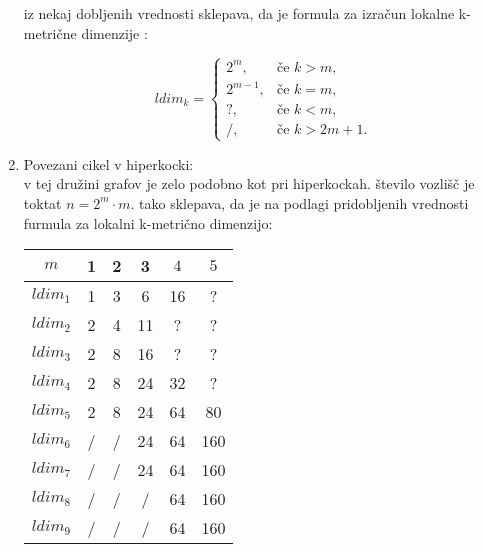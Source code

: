\documentclass[12pt,a4paper]{amsart}
\theoremstyle{plain} %
\begin{document}
\begin{enumerate}
\begin{table}[h]
\begin{center}
\begin{tabular}{|c|c|c|c|c|c|}
            \hline
        \end{tabular}
    \end{center}
    
    
\end{table}

iz nekaj dobljenih vrednosti sklepava, da je formula za izračun lokalne k-metrične dimenzije :

\begin{equation}
ldim_k =
\begin{cases}
  2^m , & \text{če } k > m, \\
  2^{m-1} , & \text{če } k = m,\\
  ?, & \text{če } k < m, \\
  /, & \text{če } k >2 m +1 . \nonumber
\end{cases}
\end{equation}



\item Povezani cikel v hiperkocki: \\
v tej družini grafov je zelo podobno kot pri hiperkockah. število vozlišč je toktat $n= 2^m \cdot m$. tako sklepava, da je na podlagi pridobljenih vrednosti furmula za lokalni k-metrično dimenzijo:

\begin{table}[h]
    \begin{center}
        \begin{tabular}{|c|c|c|c|c|c|}
            \hline
            $m$ & 1 & 2 & 3 & $4$ & $5$ \\
            \hline
            
            
            $ldim_1$ & 1 & 3 & 6 & 16 & ? \\
            $ldim_2$ & 2 & 4 & 11 & ? & ? \\
            $ldim_3$ & 2 & 8 & 16 & ? & ? \\
            $ldim_4$ & 2 & 8 & 24 & 32 & ? \\
            $ldim_5$ & 2 & 8 & 24 & 64 & 80 \\
            $ldim_6$ & / & / & 24 & 64 & 160 \\
            $ldim_7$ & / & / & 24 & 64 & 160 \\
            $ldim_8$ & / & / & / & 64 & 160 \\
            $ldim_9$ & / & / & / & 64 & 160 \\
            
            \hline
        \end{tabular}
    \end{center}
    

\end{table}
\end{enumerate}
\end{document}
